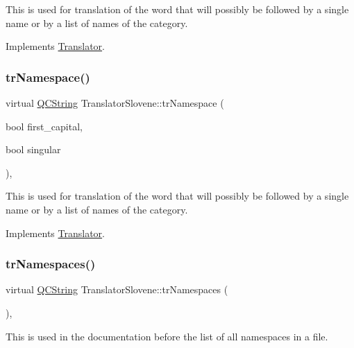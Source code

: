 This is used for translation of the word that will possibly be followed by a single name or by a list of names of the category. 

Implements \mbox{\hyperlink{class_translator}{Translator}}.

\mbox{\label{class_translator_slovene_a917565a197344303ea7dbdaa12f946f2}} 
\subsubsection{\texorpdfstring{trNamespace()}{trNamespace()}}
{\footnotesize\ttfamily virtual \mbox{\hyperlink{class_q_c_string}{Q\+C\+String}} Translator\+Slovene\+::tr\+Namespace (\begin{DoxyParamCaption}\item[{bool}]{first\+\_\+capital,  }\item[{bool}]{singular }\end{DoxyParamCaption})\hspace{0.3cm}{\ttfamily [inline]}, {\ttfamily [virtual]}}

This is used for translation of the word that will possibly be followed by a single name or by a list of names of the category. 

Implements \mbox{\hyperlink{class_translator}{Translator}}.

\mbox{\label{class_translator_slovene_add5425ba38e8d628a8548a5cd93ef0c9}} 
\subsubsection{\texorpdfstring{trNamespaces()}{trNamespaces()}}
{\footnotesize\ttfamily virtual \mbox{\hyperlink{class_q_c_string}{Q\+C\+String}} Translator\+Slovene\+::tr\+Namespaces (\begin{DoxyParamCaption}{ }\end{DoxyParamCaption})\hspace{0.3cm}{\ttfamily [inline]}, {\ttfamily [virtual]}}

This is used in the documentation before the list of all namespaces in a file. 

